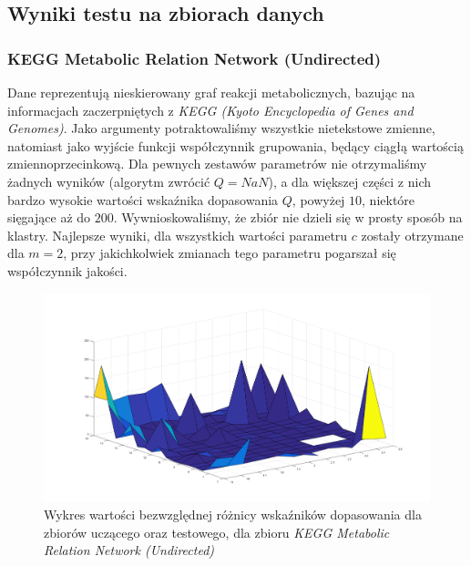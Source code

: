 \documentclass[a4paper; 11pt]{article}
\begin{document}
\subsection{Wyniki testu na zbiorach danych}
\subsubsection{KEGG Metabolic Relation Network (Undirected)}
Dane reprezentują nieskierowany graf reakcji metabolicznych, bazując na informacjach zaczerpniętych
z \emph{KEGG (Kyoto Encyclopedia of Genes and Genomes)}. Jako argumenty potraktowaliśmy wszystkie
nietekstowe zmienne, natomiast jako wyjście funkcji współczynnik grupowania, będący ciągłą
wartością zmiennoprzecinkową. Dla pewnych zestawów parametrów nie otrzymaliśmy żadnych wyników
(algorytm zwrócić $Q = NaN$), a dla większej części z nich bardzo wysokie wartości wskaźnika
dopasowania $Q$, powyżej $10$, niektóre sięgające aż do $200$. Wywnioskowaliśmy, że zbiór nie dzieli
się w prosty sposób na klastry. Najlepsze wyniki, dla wszystkich wartości parametru $c$ zostały otrzymane
dla $m = 2$, przy jakichkolwiek zmianach tego parametru pogarszał się współczynnik jakości.

\begin{figure}
\begin{center}
\includegraphics{dq_kegg.png}
\caption{Wykres wartości bezwzględnej różnicy wskaźników dopasowania dla zbiorów uczącego oraz testowego, dla zbioru \emph{KEGG Metabolic Relation Network (Undirected)}}
\end{center}
\end{figure}
\end{document}
